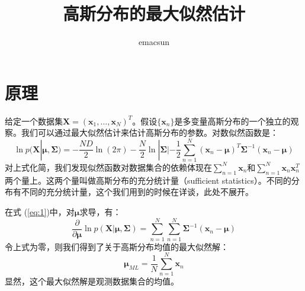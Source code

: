 \documentclass[10pt,a4paper,UTF8]{article}
\author{emacsun}
\date{}
\title{高斯分布的最大似然估计}
\begin{document}
\maketitle
\tableofcontents
{}

\section{原理}
\label{sec:orga391186}


给定一个数据集\(\mathbf{X} = (\mathbf{x}_{1},\ldots ,\mathbf{x}_{N})^{T}\)。假设\(\{\mathbf{x}_{n}\}\)是多变量高斯分布的一个独立的观察。我们可以通过最大似然估计来估计高斯分布的参数。对数似然函数是：
\begin{equation}
\label{eq:1}
\ln p(\mathbf{X}| \mathbf{\mu}, \mathbf{\Sigma}) = -\frac{ND}{2}\ln(2\pi) - \frac{N}{2}\ln|\mathbf{\Sigma}| - \frac{1}{2}\sum_{n=1}^{N}(\mathbf{x}_{n}- \mathbf{\mu})^{T}\mathbf{\Sigma}^{-1}(\mathbf{x}_{n} - \mathbf{\mu})
\end{equation}
对上式化简，我们发现似然函数对数据集合的依赖体现在\(\sum_{n=1}^{N}\mathbf{x}_{n}\)和\(\sum_{n=1}^{N}\mathbf{x}_{n}\mathbf{x}_{n}^{T}\)两个量上。这两个量叫做高斯分布的充分统计量（sufficient statistics）。不同的分布有不同的充分统计量，这个我们用到的时候在详谈，此处不展开。

在式 (\ref{eq:1})中，对\(\mathbf{\mu}\)求导，有：
\begin{equation}
\label{eq:2}
\frac{\partial }{\partial \mathbf{\mu}}\ln  p(\mathbf{X}| \mathbf{\mu}, \mathbf{\Sigma}) = \sum_{n=1}^{N} \sum_{n=1}^{N} \mathbf{\Sigma}^{-1} ( \mathbf{x}_{n} - \mathbf{\mu} )
\end{equation}
令上式为零，则我们得到了关于高斯分布均值的最大似然解：
\begin{equation}
\label{eq:3}
\mathbf{\mu}_{ML} = \frac{1}{N}\sum_{n=1}^{N}\mathbf{x}_{n}
\end{equation}
显然，这个最大似然解是观测数据集合的均值。
\end{document}
